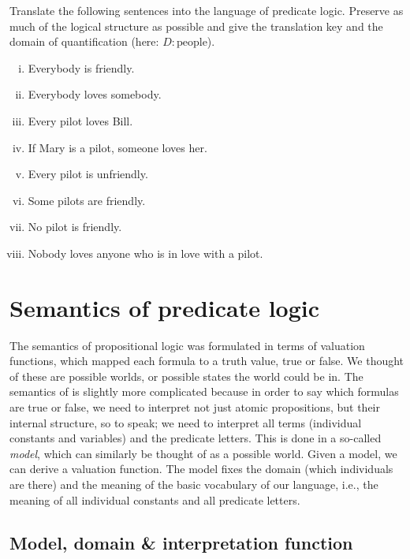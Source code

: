 \documentclass[nobib,nofonts]{tufte-handout}
\newcommand{\predlog}{\acro{PredLog}}
\begin{document}
{\begin{minipage}{1.0\textwidth}
    \begin{exercise}
      Translate the following sentences into the language of predicate logic. Preserve as much of   the logical structure as possible and give the translation key and the domain of   quantification (here: $D: \text{people}$).
      \begin{enumerate}[(i)]
        \item Everybody is friendly.
        \item Everybody loves somebody.
        \item Every pilot loves Bill.
        \item If Mary is a pilot, someone loves her.
        \item Every pilot is unfriendly.
        \item Some pilots are friendly.
        \item No pilot is friendly.
        \item Nobody loves anyone who is in love with a pilot.
      \end{enumerate}
    \end{exercise}
  \end{minipage}
}

\newpage

\section{Semantics of predicate logic}
\label{sec:semant-pred-logic}

The semantics of propositional logic was formulated in terms of valuation functions, which mapped each formula to a truth value, true or false.
We thought of these are possible worlds, or possible states the world could be in.
The semantics of \predlog is slightly more complicated because in order to say which formulas are true or false, we need to interpret not just atomic propositions, but their internal structure, so to speak; we need to interpret all terms (individual constants and variables) and the predicate letters.
This is done in a so-called \emph{model}, which can similarly be thought of as a possible world.
Given a model, we can derive a valuation function.
The model fixes the domain (which individuals are there) and the meaning of the basic vocabulary of our language, i.e., the meaning of all individual constants and all predicate letters.

\subsection{Model, domain \& interpretation function}
\label{sec:model}
\end{document}
